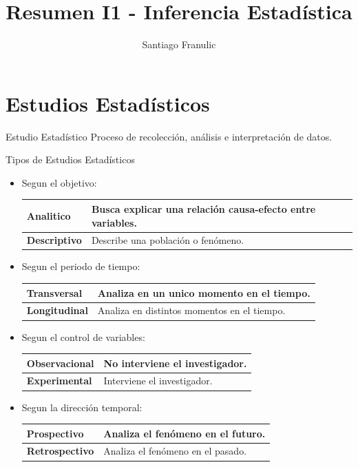 \documentclass[a4paper,11pt]{article}
\title{\textbf{\color{maincolor}Resumen I1 - Inferencia Estadística}}
\author{Santiago Franulic}
\date{}
\begin{document}
\maketitle
\tableofcontents
\newpage

\section{Estudios Estadísticos}

\begin{definicion}{Estudio Estadístico}{}
    Proceso de recolección, análisis e interpretación de datos.
\end{definicion}

\begin{definicion}{Tipos de Estudios Estadísticos}{}
    \begin{itemize}
        \item Segun el objetivo:\\
    \begin{tabular}{|l|l|}
        \hline
        \textbf{Analitico} & Busca explicar una relación causa-efecto entre variables.\\
        \hline
        \textbf{Descriptivo} & Describe una población o fenómeno.\\
        \hline
    \end{tabular}
    \vspace{0.1cm}
    \item Segun el periodo de tiempo:\\
    \begin{tabular}{|l|l|}
        \hline
        \textbf{Transversal} & Analiza en un unico momento en el tiempo.\\
        \hline
        \textbf{Longitudinal} & Analiza en distintos momentos en el tiempo.\\
        \hline
    \end{tabular}
    \vspace{0.1cm}
    \item Segun el control de variables:\\
    \begin{tabular}{|l|l|}
        \hline
        \textbf{Observacional} & No interviene el investigador.\\
        \hline
        \textbf{Experimental} & Interviene el investigador.\\
        \hline
    \end{tabular}
    \vspace{0.1cm}
    \item Segun la dirección temporal:\\
    \begin{tabular}{|l|l|}
        \hline
        \textbf{Prospectivo} & Analiza el fenómeno en el futuro.\\
        \hline
        \textbf{Retrospectivo} & Analiza el fenómeno en el pasado.\\
        \hline
    \end{tabular}
    \end{itemize}
\end{definicion}
\end{document}
